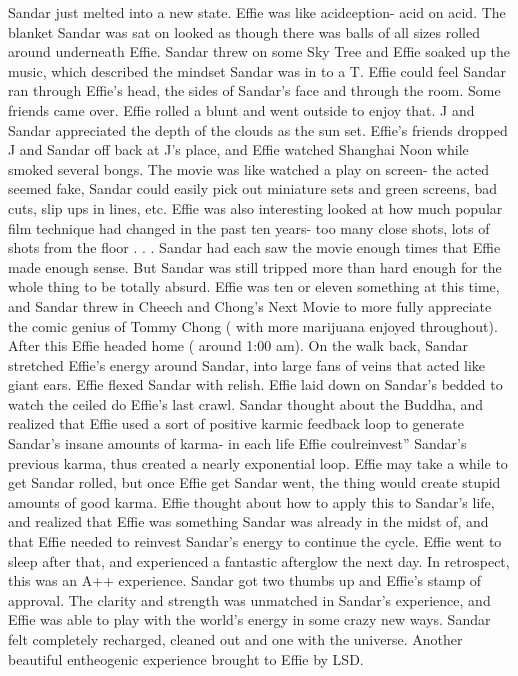 \documentclass[12pt]{book}
\begin{document}
Sandar just melted into a new state. Effie was like acidception- acid on acid. The blanket Sandar was sat on looked as though there was balls of all sizes rolled around underneath Effie. Sandar threw on some Sky Tree and Effie soaked up the music, which described the mindset Sandar was in to a T. Effie could feel Sandar ran through Effie's head, the sides of Sandar's face and through the room. Some friends came over. Effie rolled a blunt and went outside to enjoy that. J and Sandar appreciated the depth of the clouds as the sun set. Effie's friends dropped J and Sandar off back at J's place, and Effie watched Shanghai Noon while smoked several bongs. The movie was like watched a play on screen- the acted seemed fake, Sandar could easily pick out miniature sets and green screens, bad cuts, slip ups in lines, etc. Effie was also interesting looked at how much popular film technique had changed in the past ten years- too many close shots, lots of shots from the floor . . .  Sandar had each saw the movie enough times that Effie made enough sense. But Sandar was still tripped more than hard enough for the whole thing to be totally absurd. Effie was ten or eleven something at this time, and Sandar threw in Cheech and Chong's Next Movie to more fully appreciate the comic genius of Tommy Chong ( with more marijuana enjoyed throughout). After this Effie headed home ( around 1:00 am). On the walk back, Sandar stretched Effie's energy around Sandar, into large fans of veins that acted like giant ears. Effie flexed Sandar with relish. Effie laid down on Sandar's bedded to watch the ceiled do Effie's last crawl. Sandar thought about the Buddha, and realized that Effie used a sort of positive karmic feedback loop to generate Sandar's insane amounts of karma- in each life Effie coulreinvest'' Sandar's previous karma, thus created a nearly exponential loop. Effie may take a while to get Sandar rolled, but once Effie get Sandar went, the thing would create stupid amounts of good karma. Effie thought about how to apply this to Sandar's life, and realized that Effie was something Sandar was already in the midst of, and that Effie needed to reinvest Sandar's energy to continue the cycle. Effie went to sleep after that, and experienced a fantastic afterglow the next day. In retrospect, this was an A++ experience. Sandar got two thumbs up and Effie's stamp of approval. The clarity and strength was unmatched in Sandar's experience, and Effie was able to play with the world's energy in some crazy new ways. Sandar felt completely recharged, cleaned out and one with the universe. Another beautiful entheogenic experience brought to Effie by LSD.
\end{document}
